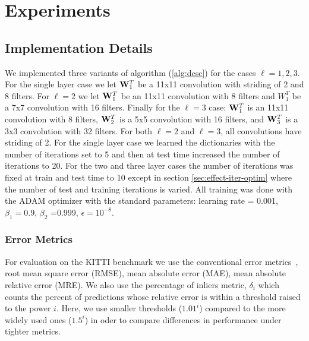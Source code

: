 \section{Experiments}

\subsection{Implementation Details}
\label{sec:impl-deta}

We implemented three variants of algorithm (\ref{alg:dcsc}) for the cases $\ell = 1,2,3$. For the single layer case we let $\mathbf{W}^T_1$ be a 11x11 convolution with striding of 2 and 8 filters. For $\ell = 2$ we let $\mathbf{W}^T_{1}$ be an 11x11 convolution with 8 filters and $W^T_{1}$ be a 7x7 convolution with 16 filters. Finally for the $\ell = 3$ case: $\mathbf{W}^T_{1}$ is an 11x11 convolution with 8 filters, $\mathbf{W}^T_{2}$ is a 5x5 convolution with 16 filters, and $\mathbf{W}^T_{3}$ is a 3x3 convolution with 32 filters. For both $\ell = 2$ and $\ell = 3$, all convolutions have striding of 2. For the single layer case we learned the dictionaries with the number of iterations set to 5 and then at test time increased the number of iterations to 20. For the two and three layer cases the number of iterations was fixed at train and test time to 10 except in section \ref{sec:effect-iter-optim} where the number of test and training iterations is varied. All training was done with the ADAM optimizer with the standard parameters: learning rate = 0.001,$\beta_1 = 0.9$, $\beta_2$ =0.999, $\epsilon = 10^{-8}$.


\subsubsection{Error Metrics}
\label{sec:error-metrics}

For evaluation on the KITTI benchmark we use the conventional error metrics~\cite{uhrig,Geiger2012CVPR}, \eg root mean square error (RMSE), mean absolute error (MAE), mean absolute relative error (MRE). We also use the percentage of inliers metric, $\delta_i$ which counts the percent of predictions whose relative error is within a threshold raised to the power $i$. Here, we use smaller thresholds ($1.01^i$) compared to the more widely used ones ($1.5^i$) in oder to compare differences in performance under tighter metrics.

